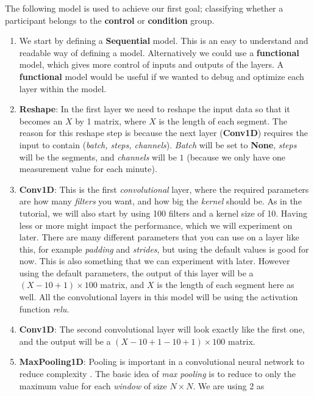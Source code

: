 The following model is used to achieve our first goal; classifying whether a participant belongs to the \textbf{control} or \textbf{condition} group.

\begin{enumerate}
  \item We start by defining a \textbf{Sequential} model. This is an easy to understand and readable way of defining a model. 
        Alternatively we could use a \textbf{functional} model, which gives more control of inputs and outputs of the layers.
        A \textbf{functional} model would be useful if we wanted to debug and optimize each layer within the model.
  \item \textbf{Reshape}: In the first layer we need to reshape the input data so that it becomes an $X$ by 1 matrix, where $X$ is the length of each segment.
        The reason for this reshape step is because the next layer (\textbf{Conv1D}) requires the input to contain (\textit{batch, steps, channels}). 
        \textit{Batch} will be set to \textbf{None}, \textit{steps} will be the segments, and \textit{channels} will be $1$ 
        (because we only have one measurement value for each minute).
  \item \textbf{Conv1D}: This is the first \textit{convolutional} layer, where the required parameters are how many \textit{filters} 
        you want, and how big the \textit{kernel} should be. As in the tutorial, we will also start by using 100 filters and a kernel size of 10. 
        Having less or more might impact the performance, which we will experiment on later.
        There are many different parameters that you can use on a layer like this, for example \textit{padding} and \textit{strides},
        but using the default values is good for now. This is also something that we can experiment with later.
        However using the default parameters, the output of this layer will be a $(X-10+1) \times 100$ matrix, 
        and $X$ is the length of each segment here as well. All the convolutional layers in this model will be using the activation function \textit{relu}.
  \item \textbf{Conv1D}: The second convolutional layer will look exactly like the first one, and the output will be a $(X-10+1-10+1) \times 100$ matrix. 
  \item \textbf{MaxPooling1D}: Pooling is important in a convolutional neural network to reduce complexity \cite{1d_cnn}. 
        The basic idea of \textit{max pooling} is to reduce to only the maximum value for each \textit{window} of size $N \times N$. We are using 2 as 

\end{enumerate}
